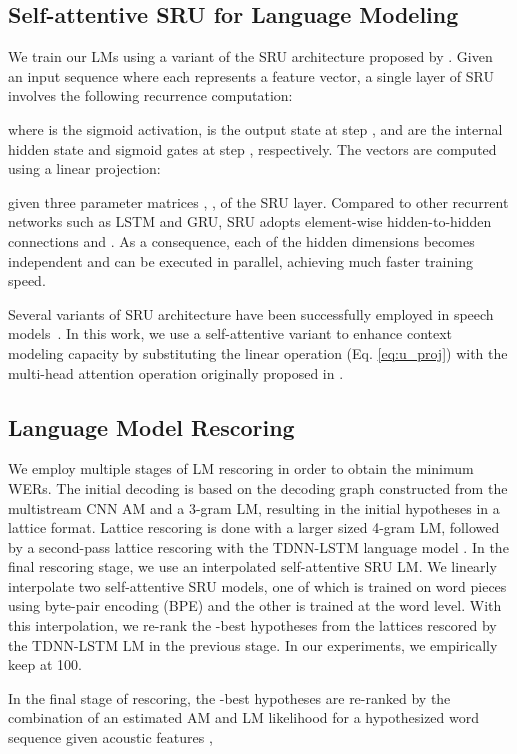 \documentclass[a4paper]{article}
\begin{document}
\subsection{Self-attentive SRU for Language Modeling}
We train our LMs using a variant of the SRU architecture proposed by \cite{lei18}. 
Given an input sequence  where each  represents a feature vector, a single layer of SRU involves the following recurrence computation:

where  is the sigmoid activation,  is the output state at step , and  are the internal hidden state and sigmoid gates at step , respectively.
The vectors  are computed using a linear projection:

given three parameter matrices , ,  of the SRU layer. 
Compared to other recurrent networks such as LSTM and GRU, SRU adopts element-wise hidden-to-hidden connections  and .
As a consequence, each of the hidden dimensions becomes independent and can be executed in parallel, achieving much faster training speed.

Several variants of SRU architecture have been successfully employed in speech models~\cite{park2018fully,shangguan2019optimizing,Koriyama_2020}.
In this work, we use a self-attentive variant to enhance context modeling capacity by substituting the linear operation (Eq. \ref{eq:u_proj}) with the multi-head attention operation originally proposed in \cite{vaswani}.


\subsection{Language Model Rescoring}
We employ multiple stages of LM rescoring in order to obtain the minimum WERs. The initial decoding is based on the decoding graph constructed from the multistream CNN AM and a 3-gram LM, resulting in the initial hypotheses in a lattice format. Lattice rescoring is done with a larger sized 4-gram LM, followed by a second-pass lattice rescoring with the TDNN-LSTM language model \cite{Li2018}. In the final rescoring stage, we use an interpolated self-attentive SRU LM. We linearly interpolate two self-attentive SRU models, one of which is trained on word pieces using byte-pair encoding (BPE) and the other is trained at the word level. With this interpolation, we re-rank the -best hypotheses from the lattices rescored by the TDNN-LSTM LM in the previous stage. In our experiments, we empirically keep  at 100. 

In the final stage of rescoring, the -best hypotheses are re-ranked by the combination of an estimated AM and LM likelihood for a hypothesized word sequence  given acoustic features ,
\end{document}
